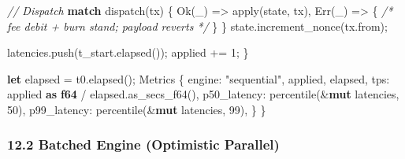 \documentclass[11pt,a4paper]{article}
\providecommand{\NormalTok}[1]{#1}
\providecommand{\KeywordTok}[1]{\textbf{#1}}
\providecommand{\DataTypeTok}[1]{\textbf{#1}}
\providecommand{\CommentTok}[1]{\textit{#1}}
\providecommand{\StringTok}[1]{#1}
\providecommand{\OperatorTok}[1]{#1}
\providecommand{\ControlFlowTok}[1]{\textbf{#1}}
\providecommand{\ConstantTok}[1]{#1}
\providecommand{\DecValTok}[1]{#1}
\newenvironment{Shaded}{}{}
\newenvironment{Highlighting}[1][]{\par\noindent\begin{minipage}{\linewidth}\ttfamily\small}{\end{minipage}\par}
\begin{document}
\begin{Shaded}
\begin{Highlighting}[]
        \CommentTok{// Dispatch}
        \ControlFlowTok{match}\NormalTok{ dispatch(tx) }\OperatorTok{\{}
            \ConstantTok{Ok}\NormalTok{(\_) }\OperatorTok{=\textgreater{}}\NormalTok{ apply(state}\OperatorTok{,}\NormalTok{ tx)}\OperatorTok{,}
            \ConstantTok{Err}\NormalTok{(\_) }\OperatorTok{=\textgreater{}} \OperatorTok{\{} \CommentTok{/* fee debit + burn stand; payload reverts */} \OperatorTok{\}}
        \OperatorTok{\}}
\NormalTok{        state}\OperatorTok{.}\NormalTok{increment\_nonce(tx}\OperatorTok{.}\NormalTok{from)}\OperatorTok{;}

\NormalTok{        latencies}\OperatorTok{.}\NormalTok{push(t\_start}\OperatorTok{.}\NormalTok{elapsed())}\OperatorTok{;}
\NormalTok{        applied }\OperatorTok{+=} \DecValTok{1}\OperatorTok{;}
    \OperatorTok{\}}

    \KeywordTok{let}\NormalTok{ elapsed }\OperatorTok{=}\NormalTok{ t0}\OperatorTok{.}\NormalTok{elapsed()}\OperatorTok{;}
\NormalTok{    Metrics }\OperatorTok{\{}
\NormalTok{        engine}\OperatorTok{:} \StringTok{"sequential"}\OperatorTok{,}
\NormalTok{        applied}\OperatorTok{,}
\NormalTok{        elapsed}\OperatorTok{,}
\NormalTok{        tps}\OperatorTok{:}\NormalTok{ applied }\KeywordTok{as} \DataTypeTok{f64} \OperatorTok{/}\NormalTok{ elapsed}\OperatorTok{.}\NormalTok{as\_secs\_f64()}\OperatorTok{,}
\NormalTok{        p50\_latency}\OperatorTok{:}\NormalTok{ percentile(}\OperatorTok{\&}\KeywordTok{mut}\NormalTok{ latencies}\OperatorTok{,} \DecValTok{50}\NormalTok{)}\OperatorTok{,}
\NormalTok{        p99\_latency}\OperatorTok{:}\NormalTok{ percentile(}\OperatorTok{\&}\KeywordTok{mut}\NormalTok{ latencies}\OperatorTok{,} \DecValTok{99}\NormalTok{)}\OperatorTok{,}
    \OperatorTok{\}}
\OperatorTok{\}}
\end{Highlighting}
\end{Shaded}

\hypertarget{batched-engine-optimistic-parallel}{%
\subsubsection{12.2 Batched Engine (Optimistic Parallel)}\label{batched-engine-optimistic-parallel}}
\end{document}
